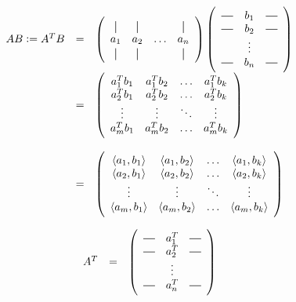 \documentclass{article}
\theoremstyle{definition}
\newcommand*{\vertbar}{\rule[-1ex]{0.5pt}{2.5ex}}
\newcommand*{\horzbar}{\rule[.5ex]{2.5ex}{0.5pt}}
\begin{document}
\begin{equation*}
\begin{array}{llll}
AB := A^{T}B
&=&
\left(
	\begin{array}{cccc}
		\vertbar & \vertbar &        & \vertbar \\
		a_{1}    & a_{2}    & \ldots & a_{n}    \\
		\vertbar & \vertbar &        & \vertbar 
	\end{array}
	\right )
	\left(
		\begin{array}{ccc}
		\horzbar & b_{1} & \horzbar \\
		\horzbar & b_{2} & \horzbar \\
				 & \vdots    &          \\
		\horzbar & b_{n} & \horzbar
	\end{array}
	\right ) \\

&=&
	\left (
		\begin{array}{cccc}
		a_{1}^{T} b_{1} & a_{1}^{T} b_{2} & \hdots & a_{1}^{T} b_{k} \\
		a_{2}^{T} b_{1} & a_{2}^{T} b_{2} & \hdots & a_{2}^{T} b_{k} \\
		\vdots          & \vdots          & \ddots & \vdots       										 \\
		a_{m}^{T} b_{1} & a_{m}^{T} b_{2} & \hdots & a_{m}^{T} b_{k}
	\end{array}
	\right ) \\ \\

&=&
	\left(
		\begin{array}{cccc}
		\langle a_{1}, b_{1} \rangle & \langle  a_{1}, b_{2} \rangle & \hdots & \langle a_{1}, b_{k} \rangle \\
		\langle a_{2}, b_{1} \rangle & \langle a_{2}, b_{2} \rangle  & \hdots & \langle a_{2}, b_{k} \rangle \\
		\vdots                       & \vdots                        & \ddots & \vdots       										 \\
		\langle a_{m}, b_{1} \rangle & \langle a_{m}, b_{2} \rangle  & \hdots & \langle a_{m}, b_{k} \rangle
	\end{array}
	\right ) \\
 \end{array}
\end{equation*}



\newpage
\begin{equation*}
\begin{array}{llll}
A^{T} 
&=& \left(
		\begin{array}{ccc}
		\horzbar & a^{T}_{1} & \horzbar \\
		\horzbar & a^{T}_{2} & \horzbar \\
				 & \vdots    &          \\
		\horzbar & a^{T}_{n} & \horzbar
	\end{array}
	\right )
\end{array}
\end{equation*}
%
%
\end{document}
